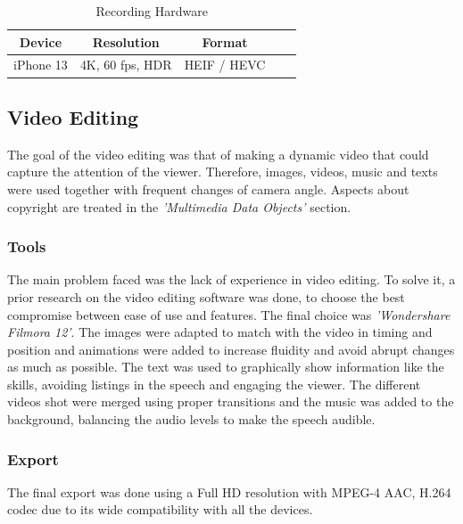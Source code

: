 \documentclass{article}
\begin{document}
\begin{multicols}{2}
            \begin{table}[H]
                \centering
                \caption{Recording Hardware}
                \label{tab:recording_hardware}
                \begin{tabular}{|c|c|c|c|c|}
                    \hline
                    \textbf{Device} & \textbf{Resolution} & \textbf{Format}\\ \hline
                    iPhone 13 & 4K, 60 fps, HDR & HEIF / HEVC \\ \hline

                    
                \end{tabular}    
            \end{table}


    \subsection{Video Editing}
    The goal of the video editing was that of making a dynamic video that could capture the attention of the viewer. Therefore, images, videos, music and texts were used together with frequent changes of camera angle.
    Aspects about copyright are treated in the \textit{'Multimedia Data Objects'} section.

        \subsubsection{Tools}
        The main problem faced was the lack of experience in video editing. To solve it, a prior research on the video editing software was done, to choose the best compromise between ease of use and features.
        The final choice was \textit{'Wondershare Filmora 12'}. The images were adapted to match with the video in timing and position and animations were added to increase fluidity and avoid abrupt changes as
        much as possible. The text was used to graphically show information like the skills, avoiding listings in the speech and engaging the viewer.
        The different videos shot were merged using proper transitions and the music was added to the background, balancing the audio levels to make the speech audible.

        \subsubsection{Export}
        The final export was done using a Full HD resolution with MPEG-4 AAC, H.264 codec due to its wide compatibility with all the devices. 



\end{multicols}
\end{document}
